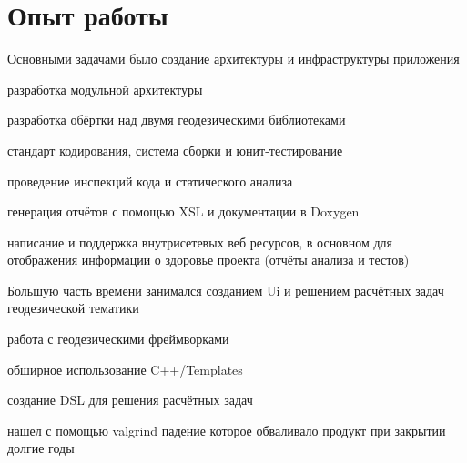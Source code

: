 \documentclass[a4paper]{curricula-vitae}
\begin{document}
\hfill
\begin{minipage}[t]{0.66\textwidth}%

\section{Опыт работы} 

Основными задачами было создание архитектуры и инфраструктуры приложения
\vspace{\topsep} %
\begin{tightitemize}
\item разработка модульной архитектуры
\item разработка обёртки над двумя геодезическими библиотеками
\item стандарт кодирования, система сборки и юнит-тестирование
\item проведение инспекций кода и статического анализа
\item генерация отчётов с помощью XSL и документации в Doxygen
\item написание и поддержка внутрисетевых веб ресурсов, в основном для отображения
информации о здоровье проекта (отчёты анализа и тестов)
\end{tightitemize}

\insertspace

Большую часть времени занимался созданием Ui и
решением расчётных задач геодезической тематики
\begin{tightitemize}
\item работа с геодезическими фреймворками
\item обширное использование C++/Templates
\item создание DSL для решения расчётных задач
\item нашел с помощью valgrind падение которое обваливало продукт при закрытии долгие годы
\end{tightitemize}


\end{minipage}
\end{document}
